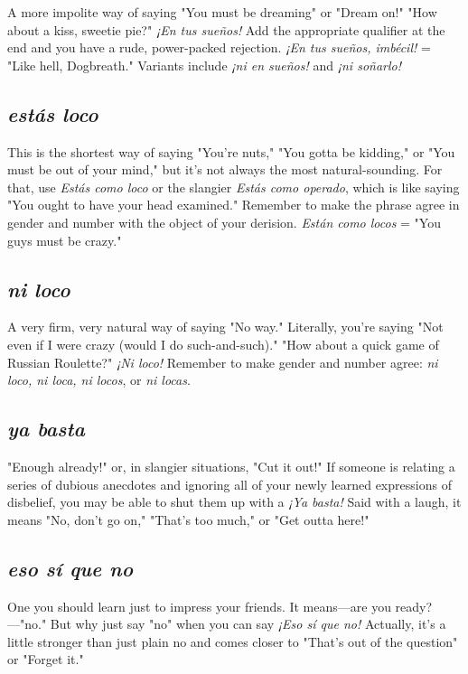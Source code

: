 A more impolite way of saying "You must be dreaming" or
"Dream on!" "How about a kiss, sweetie pie?" \emph{¡En tus sueños!} Add the
appropriate qualifier at the end and you have a rude, power-packed rejection. \emph{¡En tus sueños, imbécil!} = "Like hell, Dogbreath." Variants
include \emph{¡ni en sueños!} and \emph{¡ni soñarlo!}

\subsection{\emph{estás loco}}

This is the shortest way of saying "You're nuts," "You gotta be
kidding," or "You must be out of your mind," but it's not always the
most natural-sounding. For that, use \emph{Estás como loco} or the slangier
\emph{Estás como operado}, which is like saying "You ought to have your
head examined." Remember to make the phrase agree in gender and
number with the object of your derision. \emph{Están como locos} = "You
guys must be crazy."

\subsection{\emph{ni loco}}

A very firm, very natural way of saying "No way." Literally,
you're saying "Not even if I were crazy (would I do such-and-such)."
"How about a quick game of Russian Roulette?" \emph{¡Ni loco!} Remember to make gender and number agree: \emph{ni loco, ni loca, ni locos}, or
\emph{ni locas}.

\subsection{\emph{ya basta}}

"Enough already!" or, in slangier situations, "Cut it out!" If
someone is relating a series of dubious anecdotes and ignoring all of
your newly learned expressions of disbelief, you may be able to shut
them up with a \emph{¡Ya basta!} Said with a laugh, it means "No, don't go
on," "That's too much," or "Get outta here!"

\subsection{\emph{eso sí que no}}

One you should learn just to impress your friends. It means---are you ready?---"no." But why just say "no" when you can say \emph{¡Eso sí
que no!} Actually, it's a little stronger than just plain no and comes
closer to "That's out of the question" or "Forget it."

